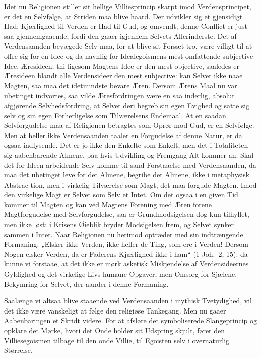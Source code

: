 \documentclass[12pt]{book}
\begin{document}
Idet nu Religionen stiller sit hellige Villiesprincip skarpt imod
Verdensprincipet, er det en Selvfølge, at Striden maa blive haard.
Der udvikler sig et gjensidigt Had: Kjærlighed til Verden er Had til
Gud, og omvendt; denne Conflict er just saa gjennemgaaende, fordi
den gaaer igjennem Selvets Allerinderste. Det af Verdensaanden
bevægede Selv maa, for at blive sit Forsæt tro, være villigt til at
offre sig for en Idee og da navnlig for Idealegoismens mest
omfattende subjective Idee, Æresideen; thi ligesom Magtens Idee er
den mest objective, saaledes er Æresideen blandt alle Verdensideer
den mest subjective: kan Selvet ikke naae Magten, saa maa det
idetmindste bevare Æren. Dersom Ærens Maal nu var ubetinget
indvortes, saa vilde Æresfordringen være en saa inderlig, absolut
afgjørende Selvhedsfordring, at Selvet deri begreb sin egen Evighed
og satte sig selv og sin egen Forherligelse som Tilværelsens
Endemaal. At en saadan Selvforgudelse maa af Religionen betragtes
som Oprør mod Gud, er en Selvfølge. Men at heller ikke
Verdensaanden taaler en Forgudelse af denne Natur, er da ogsaa
indlysende. Det er jo ikke den Enkelte som Enkelt, men det i
Totaliteten sig aabenbarende Almene, paa hvis Udvikling og Fremgang
Alt kommer an. Skal det for Ideen arbeidende Selv komme til sand
Forstaaelse med Verdensaanden, da maa det ubetinget leve for det
Almene, begribe det Almene, ikke i metaphysisk Abstrac\-
tion, men i virkelig Tilværelse som Magt, det maa forgude Magten.
Imod den virkelige Magt er Selvet som Selv et Intet. Om det ogsaa i
en given Tid kommer til Magten og kan ved Magtens Forening med Æren
forene Magtforgudelse med Selvforgudelse, saa er Grundmodsigelsen
dog kun tilhyllet, men ikke løst: i Krisens Øieblik bryder
Modsigelsen frem, og Selvet synker sammen i Intet. Naar Religionen
nu herimod optræder med sin indtrængende Formaning: „Elsker ikke
Verden, ikke heller de Ting, som ere i Verden! Dersom Nogen elsker
Verden, da er Faderens Kjærlighed ikke i ham“ (1 Joh.\ 2, 15): da
kunne vi forstaae, at det ikke er mørk asketisk Miskjendelse af
Verdensideernes Gyldighed og det virkelige Livs humane Opgaver, men
Omsorg for Sjælene, Bekymring for Selvet, der aander i denne
Formaning.

Saalænge vi altsaa blive staaende ved Verdensaanden i mythisk
Tvetydighed, vil det ikke være vanskeligt at følge den religiøse
Tankegang. Men nu gaaer Aabenbaringen et Skridt videre. For at
afsløre det symboliserede Slangeprincip og opklare det Mørke, hvori
det Onde holder sit Udspring skjult, fører den Villiesegoismen
tilbage til den onde Villie, til Egoisten selv i overnaturlig
Størrelse.
\end{document}
